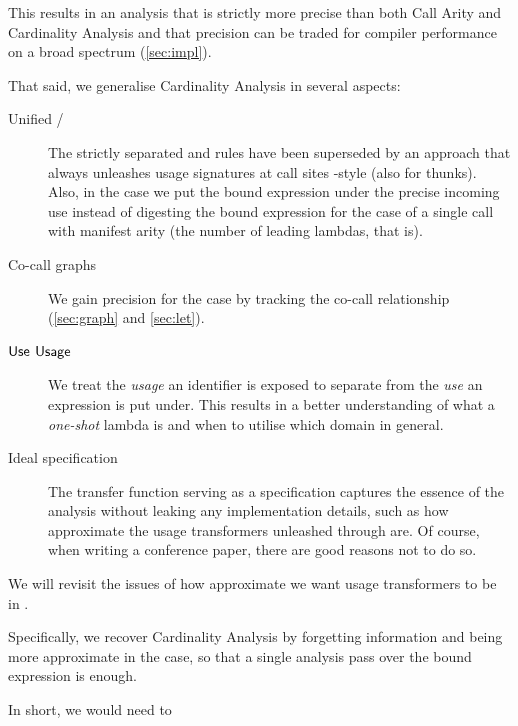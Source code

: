 This results in an analysis that is strictly more precise than both Call Arity and Cardinality Analysis and that precision can be traded for compiler performance on a broad spectrum (\cf \cref{sec:impl}).

That said, we generalise Cardinality Analysis in several aspects:

\begin{description}
  \item[Unified /] The strictly separated  and  rules have been superseded by an approach that always unleashes usage signatures at call sites -style (also for thunks). Also, in the  case we put the bound expression under the precise incoming use instead of digesting the bound expression for the case of a single call with manifest arity (the number of leading lambdas, that is).
  \item[Co-call graphs] We gain precision for the  case by tracking the co-call relationship (\cf \cref{sec:graph} and \cref{sec:let}).
  \item[$\text{\textsf{Use}}$ \vs $\text{\textsf{Usage}}$] We treat the \emph{usage} an identifier is exposed to separate from the \emph{use} an expression is put under. This results in a better understanding of what a \emph{one-shot} lambda is and when to utilise which domain in general.
  \item[Ideal specification] The transfer function serving as a specification captures the essence of the analysis without leaking any implementation details, such as how approximate the usage transformers unleashed through  are. Of course, when writing a conference paper, there are good reasons not to do so.
\end{description}

We will revisit the issues of how approximate we want usage transformers to be in .

Specifically, we recover Cardinality Analysis by forgetting information and being more approximate in the  case, so that a single analysis pass over the bound expression is enough.

In short, we would need to

